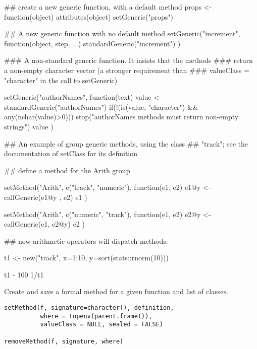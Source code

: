 \begin{Examples}
\begin{ExampleCode}


## create a new generic function, with a default method
props <- function(object) attributes(object)
setGeneric("props")

## A new generic function with no default method
setGeneric("increment",
  function(object, step, ...)
    standardGeneric("increment")
)


###   A non-standard generic function.  It insists that the methods
###   return a non-empty character vector (a stronger requirement than
###    valueClass = "character" in the call to setGeneric)

setGeneric("authorNames",
    function(text) {
      value <- standardGeneric("authorNames")
      if(!(is(value, "character") && any(nchar(value)>0)))
        stop("authorNames methods must return non-empty strings")
      value
      })



## An example of group generic methods, using the class
## "track"; see the documentation of setClass for its definition

## define a method for the Arith group

setMethod("Arith", c("track", "numeric"),
 function(e1, e2) {
  e1@y <- callGeneric(e1@y , e2)
  e1
})

setMethod("Arith", c("numeric", "track"),
 function(e1, e2) {
  e2@y <- callGeneric(e1, e2@y)
  e2
})

## now arithmetic operators  will dispatch methods:

t1 <- new("track", x=1:10, y=sort(stats::rnorm(10)))

t1 - 100
1/t1


\end{ExampleCode}
\end{Examples}
%
\begin{Description}\relax
Create and save a formal method for a given function and list of classes.
\end{Description}
%
\begin{Usage}
\begin{verbatim}
setMethod(f, signature=character(), definition,
          where = topenv(parent.frame()),
          valueClass = NULL, sealed = FALSE)

removeMethod(f, signature, where)
\end{verbatim}
\end{Usage}
